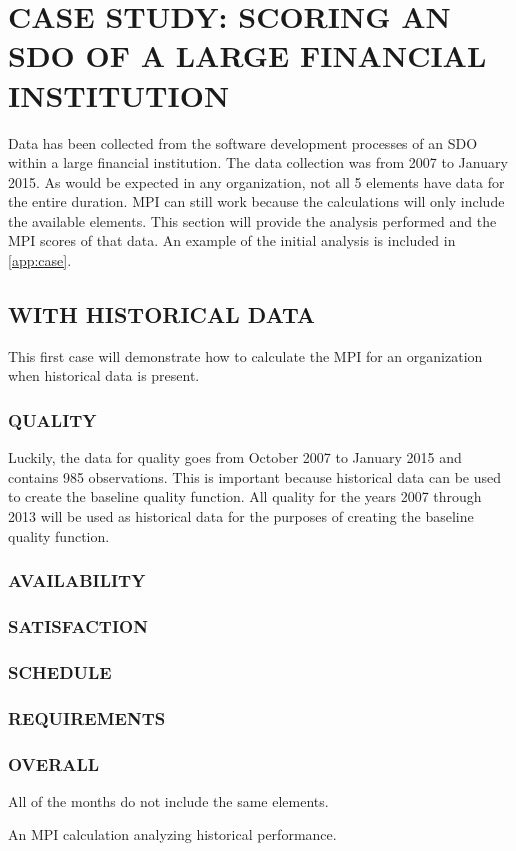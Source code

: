 \documentclass[SDSUThesis.tex]{subfiles}
\begin{document}
\section{CASE STUDY: SCORING AN SDO OF A LARGE FINANCIAL INSTITUTION}

Data has been collected from the software development processes of
an SDO within a large financial institution.
The data collection was from 2007 to January 2015. As would be expected
in any organization, not all 5 elements have data for the entire duration.
MPI can still work because the calculations will only include
the available elements.  This section will provide the analysis performed and the MPI scores of that data.  An example of the initial analysis is included in \cref{app:case}.

\subsection{WITH HISTORICAL DATA}
    This first case will demonstrate how to calculate the MPI for an
    organization when historical data is present.  
    \subsubsection{QUALITY}
        Luckily, the data for quality goes from October 2007 to January 2015
        and contains 985 observations.
        This is important because historical data can be used to create the
        baseline quality function.  All quality for the years 2007 through 2013
        will be used as historical data for the purposes of creating
        the baseline quality function.  
    \subsubsection{AVAILABILITY}
    \subsubsection{SATISFACTION}
    \subsubsection{SCHEDULE}
    \subsubsection{REQUIREMENTS}
    \subsubsection{OVERALL}
        All of the months do not include the same elements.  

An MPI calculation analyzing historical performance.


\end{document}
